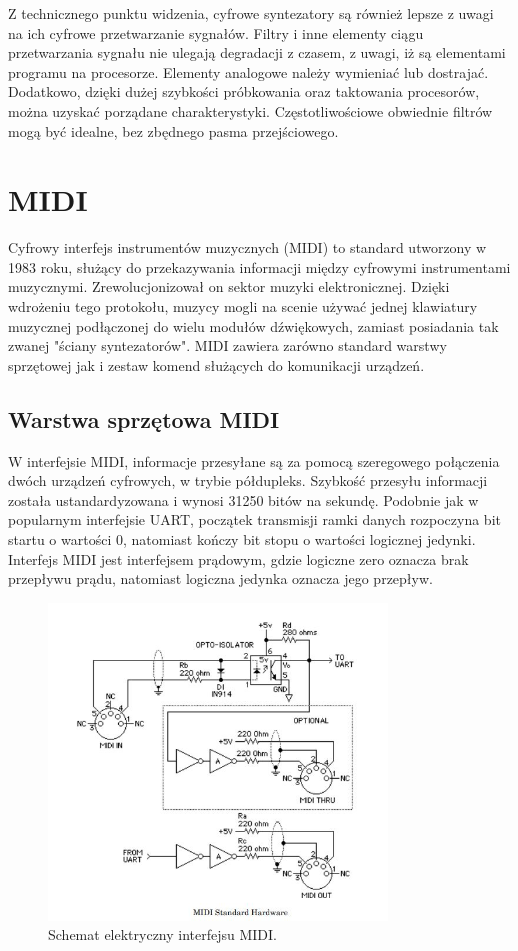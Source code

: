 Z technicznego punktu widzenia, cyfrowe syntezatory są również lepsze z uwagi na ich cyfrowe przetwarzanie sygnałów. Filtry i inne elementy ciągu przetwarzania sygnału nie ulegają degradacji z czasem, z uwagi, iż są elementami programu na procesorze. Elementy analogowe należy wymieniać lub dostrajać. Dodatkowo, dzięki dużej szybkości próbkowania oraz taktowania procesorów, można uzyskać porządane charakterystyki. Częstotliwościowe obwiednie filtrów mogą być idealne, bez zbędnego pasma przejściowego.


\section{MIDI}
Cyfrowy interfejs instrumentów muzycznych (MIDI) to standard utworzony w 1983 roku, służący do przekazywania informacji między cyfrowymi instrumentami muzycznymi. Zrewolucjonizował on sektor muzyki elektronicznej. Dzięki wdrożeniu tego protokołu, muzycy mogli na scenie używać jednej klawiatury muzycznej podłączonej do wielu modułów dźwiękowych, zamiast posiadania tak zwanej "ściany syntezatorów". MIDI zawiera zarówno standard warstwy sprzętowej jak i zestaw komend służących do komunikacji urządzeń.

\subsection{Warstwa sprzętowa MIDI}
W interfejsie MIDI, informacje przesyłane są za pomocą szeregowego połączenia dwóch urządzeń cyfrowych, w trybie półdupleks. Szybkość przesyłu informacji została ustandardyzowana i wynosi 31250 bitów na sekundę. Podobnie jak w popularnym interfejsie UART, początek transmisji ramki danych rozpoczyna bit startu o wartości 0, natomiast kończy bit stopu o wartości logicznej jedynki. Interfejs MIDI jest interfejsem prądowym, gdzie logiczne zero oznacza brak przepływu prądu, natomiast logiczna jedynka oznacza jego przepływ.

\begin{figure}[H]
	\centering
	\includegraphics[width=9cm]{./grafiki/hardware_midi}
	\captionsetup{justification=centering}
	\caption{Schemat elektryczny interfejsu MIDI.}
	\label{rys:hardware_midi}
\end{figure}

